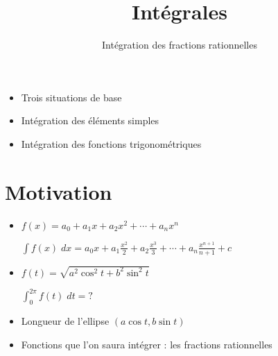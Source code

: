 









\title{{\bf Intégrales}}
\subtitle{Intégration des fractions rationnelles}

\begin{frame}
  
  \debutmontitre

  \pause

{\footnotesize
\hfill
{}
\begin{minipage}{0.6\textwidth}
  \begin{itemize}
    \item<3-> Trois situations de base
    \item<4-> Intégration des éléments simples
    \item<5-> Intégration des fonctions trigonométriques
  \end{itemize}
\end{minipage}
}

\end{frame}

\setcounter{framenumber}{0}




\section*{Motivation}


\begin{frame}

\begin{itemize}
  \item $f(x)=a_0+a_1x+a_2x^2+\cdots+ a_n x^n$

\pause

 $\int f(x)\; dx = a_0x+a_1\frac{x^2}{2}+a_2\frac{x^3}{3}+\cdots+a_n\frac{x^{n+1}}{n+1}+c$

\pause

  \item $f(t)=\sqrt{a^2\cos^2 t+ b^2 \sin^2 t}$

\pause

 $\int_0^{2\pi} f(t) \; dt = ?$
\pause
  \item Longueur de l'ellipse $(a\cos t, b\sin t)$


\pause
  \item Fonctions que l'on saura intégrer : les fractions rationnelles

\end{itemize}

\end{frame}




